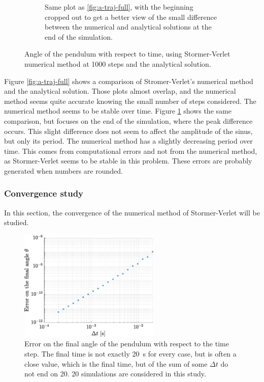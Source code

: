 \documentclass[a4paper,12pt,twoside]{article}
\begin{document}
\begin{figure}[h]
\begin{subfigure}[t]{0.45\textwidth}
	\caption{Same plot as \ref{fig:a-traj-full}, with the beginning cropped out to get a better view of the small difference between the numerical and analytical solutions at the end of the simulation.}
	\label{fig:a-traj-zoomed}
\end{subfigure}
\caption{Angle of the pendulum with respect to time, using Stormer-Verlet numerical method at \num{1000} steps and the analytical solution.}
\label{fig:a-traj}
\end{figure}

Figure \ref{fig:a-traj-full} shows a comparison of Stromer-Verlet's numerical method and the analytical solution.
Those plots almost overlap, and the numerical method seems quite accurate knowing the small number of steps considered.
The numerical method seems to be stable over time.
Figure \ref{fig:a-traj-zoomed} shows the same comparison, but focuses on the end of the simulation, where the peak difference occurs.
This slight difference does not seem to affect the amplitude of the sinus, but only its period.
The numerical method has a slightly decreasing period over time.
This comes from computational errors and not from the numerical method, as Stormer-Verlet seems to be stable in this problem.
These errors are probably generated when numbers are rounded.


\subsubsection{Convergence study}
In this section, the convergence of the numerical method of Stormer-Verlet will be studied.

\begin{figure}[h]
\centering
	\includegraphics[width=0.6\textwidth]{graphs/a_conv.eps}
	\caption{Error on the final angle of the pendulum with respect to the time step. The final time is not exactly \SI{20}{\s} for every case, but is often a close value, which is the final time, but of the sum of some $\Delta t$ do not end on \num{20}. \num{20} simulations are considered in this study.} %
	\label{fig:a-conv}
\end{figure}
\end{document}
